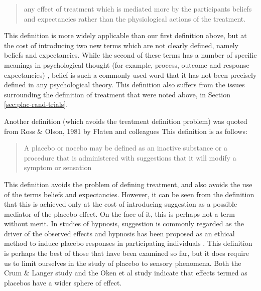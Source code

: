 \begin{quotation}
  any effect of treatment which is mediated more by the participants
  beliefs and expectancies rather than the physiological actions of
  the treatment.
\end{quotation}

This definition is more widely applicable than our first definition above, but at the cost of introducing two new terms which are not clearly defined, namely beliefs and expectancies. While the second of these terms has a number of specific meanings in psychological thought (for example, process, outcome and response expectancies) \cite{Bandura1977,Kirsch1985}, belief is such a commonly used word that it has not been precisely defined in any psychological theory. This definition also suffers from the issues surrounding the definition of treatment that were noted above, in Section \ref{sec:plac-rand-trials}. 


Another definition (which avoids the treatment definition problem) was quoted from Ross \& Olson, 1981 by Flaten and colleagues \cite{Flaten1999}
This definition is as follows:

\begin{quotation}
  A placebo or nocebo may be defined as an inactive
substance or a procedure that is administered with
suggestions that it will modify a symptom or sensation
\end{quotation}

This definition avoids the problem of defining treatment, and also avoids the use of the terms beliefs and expectancies. However, it can be seen from the definition that this is achieved only at the cost of introducing suggestion as a possible mediator of the placebo effect. On the face of it, this is perhaps not a term without merit. In studies of hypnosis, suggestion is commonly regarded as the driver of the observed effects \cite{Kirsch1994} and hypnosis has been proposed as an ethical method to induce placebo responses in participating individuals \cite{Raz2007a}. This definition is perhaps the best of those that have been examined so far, but it does require us to limit ourselves in the study of placebo to sensory phenomena. Both the Crum \& Langer study and the Oken et al study indicate that effects termed as placebos have a wider sphere of effect. 

